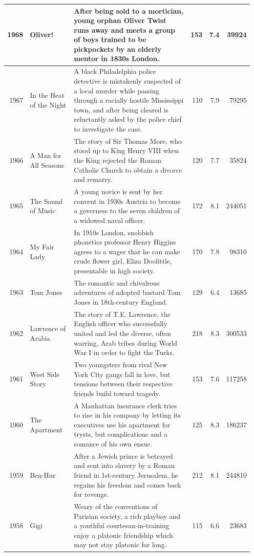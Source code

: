 \documentclass[
]{book}
\begin{document}
\begin{tabular}{r|l|l|r|r|r}
\hline
1968 & Oliver! & After being sold to a mortician, young orphan Oliver Twist runs away and meets a group of boys trained to be pickpockets by an elderly mentor in 1830s London. & 153 & 7.4 & 39924\\
\hline
1967 & In the Heat of the Night & A black Philadelphia police detective is mistakenly suspected of a local murder while passing through a racially hostile Mississippi town, and after being cleared is reluctantly asked by the police chief to investigate the case. & 110 & 7.9 & 79295\\
\hline
1966 & A Man for All Seasons & The story of Sir Thomas More, who stood up to King Henry VIII when the King rejected the Roman Catholic Church to obtain a divorce and remarry. & 120 & 7.7 & 35824\\
\hline
1965 & The Sound of Music & A young novice is sent by her convent in 1930s Austria to become a governess to the seven children of a widowed naval officer. & 172 & 8.1 & 244051\\
\hline
1964 & My Fair Lady & In 1910s London, snobbish phonetics professor Henry Higgins agrees to a wager that he can make crude flower girl, Eliza Doolittle, presentable in high society. & 170 & 7.8 & 98310\\
\hline
1963 & Tom Jones & The romantic and chivalrous adventures of adopted bastard Tom Jones in 18th-century England. & 129 & 6.4 & 13685\\
\hline
1962 & Lawrence of Arabia & The story of T.E. Lawrence, the English officer who successfully united and led the diverse, often warring, Arab tribes during World War I in order to fight the Turks. & 218 & 8.3 & 300533\\
\hline
1961 & West Side Story & Two youngsters from rival New York City gangs fall in love, but tensions between their respective friends build toward tragedy. & 153 & 7.6 & 117258\\
\hline
1960 & The Apartment & A Manhattan insurance clerk tries to rise in his company by letting its executives use his apartment for trysts, but complications and a romance of his own ensue. & 125 & 8.3 & 186237\\
\hline
1959 & Ben-Hur & After a Jewish prince is betrayed and sent into slavery by a Roman friend in 1st-century Jerusalem, he regains his freedom and comes back for revenge. & 212 & 8.1 & 244810\\
\hline
1958 & Gigi & Weary of the conventions of Parisian society, a rich playboy and a youthful courtesan-in-training enjoy a platonic friendship which may not stay platonic for long. & 115 & 6.6 & 23683\\

\end{tabular}
\end{document}
